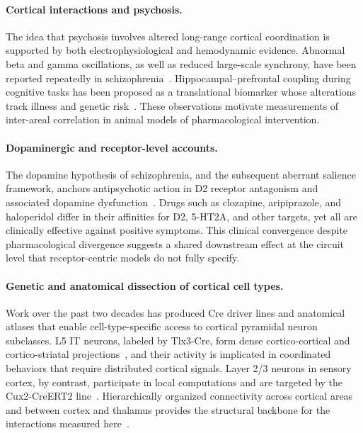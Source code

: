 \paragraph{Cortical interactions and psychosis.}
The idea that psychosis involves altered long-range cortical coordination is supported by both electrophysiological and hemodynamic evidence. Abnormal beta and gamma oscillations, as well as reduced large-scale synchrony, have been reported repeatedly in schizophrenia~\cite{uhlhaas2015oscillations, uhlhaas2013highfrequency}. Hippocampal--prefrontal coupling during cognitive tasks has been proposed as a translational biomarker whose alterations track illness and genetic risk~\cite{bahner2017hippocampal}. These observations motivate measurements of inter-areal correlation in animal models of pharmacological intervention.

\paragraph{Dopaminergic and receptor-level accounts.}
The dopamine hypothesis of schizophrenia, and the subsequent aberrant salience framework, anchors antipsychotic action in D2 receptor antagonism and associated dopamine dysfunction~\cite{howes2009dopamine, kambeitz2014alterations}. Drugs such as clozapine, aripiprazole, and haloperidol differ in their affinities for D2, 5-HT2A, and other targets, yet all are clinically effective against positive symptoms. This clinical convergence despite pharmacological divergence suggests a shared downstream effect at the circuit level that receptor-centric models do not fully specify.

\paragraph{Genetic and anatomical dissection of cortical cell types.}
Work over the past two decades has produced Cre driver lines and anatomical atlases that enable cell-type-specific access to cortical pyramidal neuron subclasses. L5 IT neurons, labeled by Tlx3-Cre, form dense cortico-cortical and cortico-striatal projections~\cite{liu2024celltype, matho2021genetic, biccn2021multimodal, shinotsuka2023layer5, atudorei2024bilateral}, and their activity is implicated in coordinated behaviors that require distributed cortical signals. Layer 2/3 neurons in sensory cortex, by contrast, participate in local computations and are targeted by the Cux2-CreERT2 line~\cite{daigle2018suite}. Hierarchically organized connectivity across cortical areas and between cortex and thalamus provides the structural backbone for the interactions measured here~\cite{harris2019hierarchical, siegle2021survey}.

